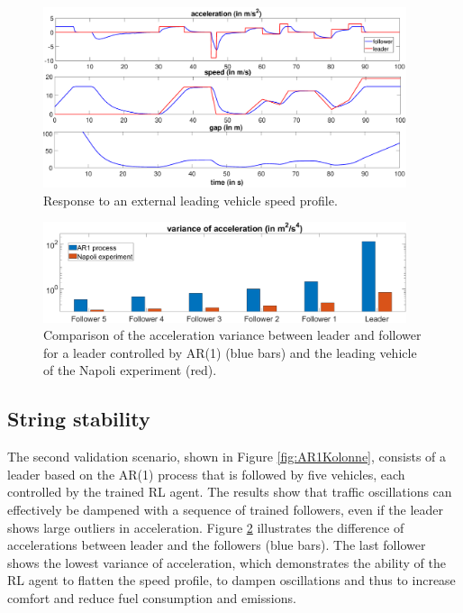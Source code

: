 \documentclass[review]{elsarticle}
\providecommand{\3}{{\ss}}
\begin{document}
\begin{figure}
	\centering
	\includegraphics[width=0.95\textwidth]{images/manipulatedLeader.eps}
	\caption{Response to an external leading vehicle speed
          profile.}
	\label{fig:manipulatedLeader}
\end{figure}

\begin{figure}
	\centering
	\includegraphics[width=0.95\textwidth]{images/VarAccComp}
	\caption{Comparison of the acceleration variance between
          leader and follower for a leader controlled by AR(1) (blue
          bars) and the leading vehicle of the Napoli experiment
          (red).}
	\label{fig:VarAccComp}
\end{figure}






\subsection{String stability}
\label{sec:stringStability}
The second validation scenario, shown in Figure
\ref{fig:AR1Kolonne}, consists of a leader based on the AR(1) process
that is
followed by five vehicles, each controlled by the trained RL
agent. The results show that traffic oscillations can effectively be
dampened with a sequence of trained followers, even if the leader
shows large outliers in acceleration. Figure \ref{fig:VarAccComp}
illustrates the difference of accelerations between leader and the
followers (blue bars). The last follower shows the lowest variance of
acceleration, which demonstrates the ability of the RL agent to
flatten the speed profile, to dampen oscillations and thus to increase
comfort and reduce fuel consumption and emissions.   
\end{document}
